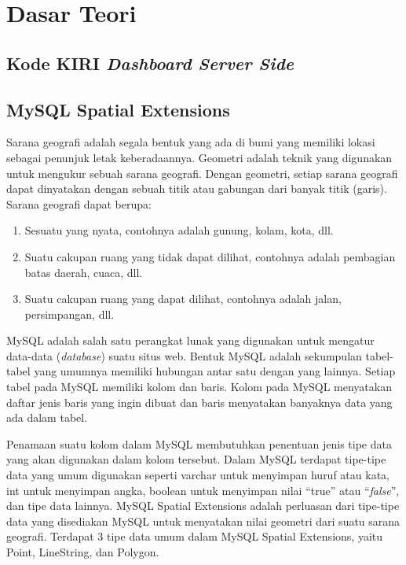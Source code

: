 \chapter{Dasar Teori}
\label{chap:dasar_teori}

\section{Kode KIRI \textit{Dashboard Server Side}}
\label{sec:dt_kodekiri}

\section{MySQL Spatial Extensions}
\label{sec:mysql_spatial_ex}
	Sarana geografi\cite{mysqlspatial} adalah segala bentuk yang ada di bumi yang memiliki lokasi sebagai penunjuk letak keberadaannya. Geometri adalah teknik yang digunakan untuk mengukur sebuah sarana geografi. Dengan geometri, setiap sarana geografi dapat dinyatakan dengan sebuah titik atau gabungan dari banyak titik (garis). Sarana geografi dapat berupa:
	\begin{enumerate}
		\item Sesuatu yang nyata, contohnya adalah gunung, kolam, kota, dll.
		\item Suatu cakupan ruang yang tidak dapat dilihat, contohnya adalah pembagian batas daerah, cuaca, dll.
		\item Suatu cakupan ruang yang dapat dilihat, contohnya adalah jalan, persimpangan, dll.
	\end{enumerate}
	
	MySQL adalah salah satu perangkat lunak yang digunakan untuk mengatur data-data (\textit{database}) suatu situs web. Bentuk MySQL adalah sekumpulan tabel-tabel yang umumnya memiliki hubungan antar satu dengan yang lainnya. Setiap tabel pada MySQL memiliki kolom dan baris. Kolom pada MySQL menyatakan daftar jenis baris yang ingin dibuat dan baris menyatakan banyaknya data yang ada dalam tabel.
	
	Penamaan suatu kolom dalam MySQL membutuhkan penentuan jenis tipe data yang akan digunakan dalam kolom tersebut. Dalam MySQL terdapat tipe-tipe data yang umum digunakan seperti varchar untuk menyimpan huruf atau kata, int untuk menyimpan angka, boolean untuk menyimpan nilai ``\textit{}true'' atau ``\textit{false}'', dan tipe data lainnya. MySQL Spatial Extensions adalah perluasan dari tipe-tipe data yang disediakan MySQL untuk menyatakan nilai geometri dari suatu sarana geografi. Terdapat 3 tipe data umum dalam MySQL Spatial Extensions, yaitu Point, LineString, dan Polygon.
	
